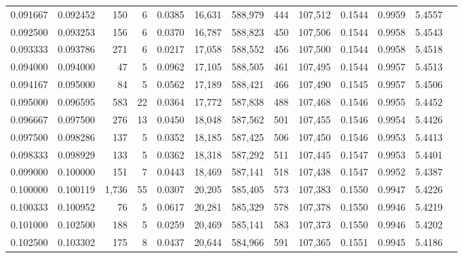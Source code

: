 \begin{tabular}{rrrrrrrrrrrrr}
0.091667 & 0.092452 &   150 &   6 &                                     0.0385 &  16,631 & 588,979 &     444 & 107,512 & 0.1544 & 0.9959 & 5.4557 \\
0.092500 & 0.093253 &   156 &   6 &                                     0.0370 &  16,787 & 588,823 &     450 & 107,506 & 0.1544 & 0.9958 & 5.4543 \\
0.093333 & 0.093786 &   271 &   6 &                                     0.0217 &  17,058 & 588,552 &     456 & 107,500 & 0.1544 & 0.9958 & 5.4518 \\
0.094000 & 0.094000 &    47 &   5 &                                     0.0962 &  17,105 & 588,505 &     461 & 107,495 & 0.1544 & 0.9957 & 5.4513 \\
0.094167 & 0.095000 &    84 &   5 &                                     0.0562 &  17,189 & 588,421 &     466 & 107,490 & 0.1545 & 0.9957 & 5.4506 \\
0.095000 & 0.096595 &   583 &  22 &                                     0.0364 &  17,772 & 587,838 &     488 & 107,468 & 0.1546 & 0.9955 & 5.4452 \\
0.096667 & 0.097500 &   276 &  13 &                                     0.0450 &  18,048 & 587,562 &     501 & 107,455 & 0.1546 & 0.9954 & 5.4426 \\
0.097500 & 0.098286 &   137 &   5 &                                     0.0352 &  18,185 & 587,425 &     506 & 107,450 & 0.1546 & 0.9953 & 5.4413 \\
0.098333 & 0.098929 &   133 &   5 &                                     0.0362 &  18,318 & 587,292 &     511 & 107,445 & 0.1547 & 0.9953 & 5.4401 \\
0.099000 & 0.100000 &   151 &   7 &                                     0.0443 &  18,469 & 587,141 &     518 & 107,438 & 0.1547 & 0.9952 & 5.4387 \\
0.100000 & 0.100119 & 1,736 &  55 &                                     0.0307 &  20,205 & 585,405 &     573 & 107,383 & 0.1550 & 0.9947 & 5.4226 \\
0.100333 & 0.100952 &    76 &   5 &                                     0.0617 &  20,281 & 585,329 &     578 & 107,378 & 0.1550 & 0.9946 & 5.4219 \\
0.101000 & 0.102500 &   188 &   5 &                                     0.0259 &  20,469 & 585,141 &     583 & 107,373 & 0.1550 & 0.9946 & 5.4202 \\
0.102500 & 0.103302 &   175 &   8 &                                     0.0437 &  20,644 & 584,966 &     591 & 107,365 & 0.1551 & 0.9945 & 5.4186 \\

\end{tabular}
